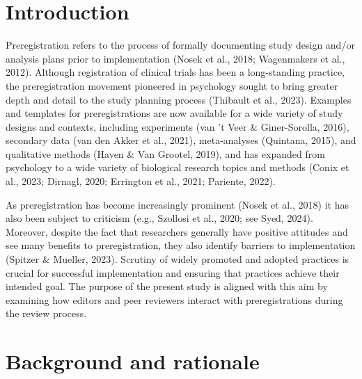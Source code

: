 \documentclass[authordate, empirical]{jote-new-article}
\author[1]{\mbox{Moin Syed\orcid{0000-0003-4759-3555}}}
\affil[1]{University of Minnesota}
\begin{document}
\begin{frontmatter}
  \maketitle
  \begin{abstract}
    \printabstracttext
  \end{abstract}
\end{frontmatter}





	\section{\textbf{Introduction}}



	Preregistration refers to the process of formally documenting study design and/or analysis plans prior to implementation (Nosek et al., 2018; Wagenmakers et al., 2012). Although registration of clinical trials has been a long-standing practice, the preregistration movement pioneered in psychology sought to bring greater depth and detail to the study planning process (Thibault et al., 2023). Examples and templates for preregistrations are now available for a wide variety of study designs and contexts, including experiments (van 't Veer \& Giner-Sorolla, 2016), secondary data (van den Akker et al., 2021), meta-analyses (Quintana, 2015), and qualitative methods (Haven \& Van Grootel, 2019), and has expanded from psychology to a wide variety of biological research topics and methods (Conix et al., 2023; Dirnagl, 2020; Errington et al., 2021; Pariente, 2022).



	As preregistration has become increasingly prominent (Nosek et al., 2018) it has also been subject to criticism (e.g., Szollosi et al., 2020; see Syed, 2024). Moreover, despite the fact that researchers generally have positive attitudes and see many benefits to preregistration, they also identify barriers to implementation (Spitzer \& Mueller, 2023). Scrutiny of widely promoted and adopted practices is crucial for successful implementation and ensuring that practices achieve their intended goal. The purpose of the present study is aligned with this aim by examining how editors and peer reviewers interact with preregistrations during the review process.



	\section{\textbf{Background and rationale}}
\end{document}
